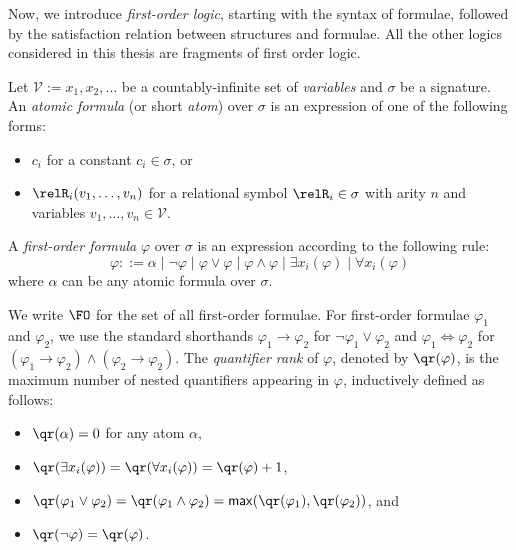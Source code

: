 Now, we introduce \emph{first-order logic}, starting with the syntax of formulae, followed by the satisfaction relation between structures and formulae.
All the other logics considered in this thesis are fragments of first order logic.
\begin{definition}
  Let $\mathcal{V} := {x_{1}, x_{2}, \ldots}$ be a countably-infinite set of \emph{variables} and $\sigma$ be a signature.
  An \emph{atomic formula} (or short \emph{atom}) over $\sigma$ is an expression of one of the following forms:
  \begin{itemize}
    \item $c_{i}$ for a constant $c_{i} \in \sigma$, or
    \item $\relR_{i}(v_{1}, \ldots, v_{n})$ for a relational symbol $\relR_{i} \in \sigma$ with arity $n$ and variables $v_{1}, \ldots, v_{n} \in \mathcal{V}$.
  \end{itemize}
  A \emph{first-order formula} $\varphi$ over $\sigma$ is an expression according to the following rule:
  \begin{equation*}
    \varphi ::= \alpha
      \mid \neg \varphi
      \mid \varphi \lor \varphi
      \mid \varphi \land \varphi
      \mid \exists{x_{i}}(\varphi)
      \mid \forall{x_{i}}(\varphi)
  \end{equation*}
  where $\alpha$ can be any atomic formula over $\sigma$.
\end{definition}
We write $\FO$ for the set of all first-order formulae.
For first-order formulae $\varphi_{1}$ and $\varphi_{2}$, we use the standard shorthands $\varphi_{1} \to \varphi_{2}$ for $\neg \varphi_{1} \lor \varphi_{2}$ and $\varphi_{1} \iff \varphi_{2}$ for $(\varphi_{1} \to \varphi_{2}) \land (\varphi_{2} \to \varphi_{2})$.
The \emph{quantifier rank} of $\varphi$, denoted by $\qr(\varphi)$, is the maximum number of nested quantifiers appearing in $\varphi$, inductively defined as follows:
\begin{itemize}
  \item $\qr(\alpha) = 0$ for any atom $\alpha$,
  \item $\qr(\exists{x_{i}}(\varphi)) = \qr(\forall{x_{i}}(\varphi)) = \qr(\varphi) + 1$,
  \item $\qr(\varphi_{1} \lor \varphi_{2}) = \qr(\varphi_{1} \land \varphi_{2})  = \mathsf{max}(\qr(\varphi_{1}), \qr(\varphi_{2}))$, and
  \item $\qr(\neg \varphi)  = \qr(\varphi)$.
\end{itemize}

